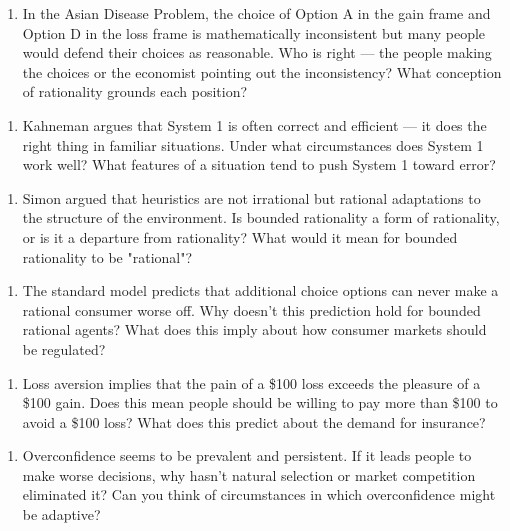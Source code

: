\documentclass[12pt, letterpaper]{article}
\begin{document}
\begin{enumerate}
\item In the Asian Disease Problem, the choice of Option A in the gain frame and Option D in the loss frame is mathematically inconsistent but many people would defend their choices as reasonable. Who is right --- the people making the choices or the economist pointing out the inconsistency? What conception of rationality grounds each position?
\end{enumerate}

\begin{enumerate}
\item Kahneman argues that System 1 is often correct and efficient --- it does the right thing in familiar situations. Under what circumstances does System 1 work well? What features of a situation tend to push System 1 toward error?
\end{enumerate}

\begin{enumerate}
\item Simon argued that heuristics are not irrational but rational adaptations to the structure of the environment. Is bounded rationality a form of rationality, or is it a departure from rationality? What would it mean for bounded rationality to be "rational"?
\end{enumerate}

\begin{enumerate}
\item The standard model predicts that additional choice options can never make a rational consumer worse off. Why doesn't this prediction hold for bounded rational agents? What does this imply about how consumer markets should be regulated?
\end{enumerate}

\begin{enumerate}
\item Loss aversion implies that the pain of a \$100 loss exceeds the pleasure of a \$100 gain. Does this mean people should be willing to pay more than \$100 to avoid a \$100 loss? What does this predict about the demand for insurance?
\end{enumerate}

\begin{enumerate}
\item Overconfidence seems to be prevalent and persistent. If it leads people to make worse decisions, why hasn't natural selection or market competition eliminated it? Can you think of circumstances in which overconfidence might be adaptive?
\end{enumerate}
\end{document}
